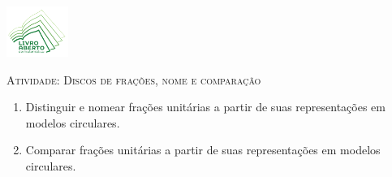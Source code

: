 \documentclass[10 pt,usenames,dvipsnames, oneside]{article}
\begin{document}
\begin{center}
  \begin{minipage}[l]{3cm}
\includegraphics[width=2cm]{logo}    
\end{minipage}\hfill
\begin{minipage}[r]{.8\textwidth}
 {\Large \scshape Atividade: Discos de frações, nome e comparação}  
\end{minipage}
\end{center}
\vspace{.2cm}

\ifdefined\prof
\begin{goals}
\begin{enumerate}

 \item Distinguir e nomear frações unitárias a partir de suas representações em modelos circulares.
\item  Comparar frações unitárias a partir de suas representações em modelos circulares.

\end{enumerate}
\tcblower


\end{goals}
\end{document}
